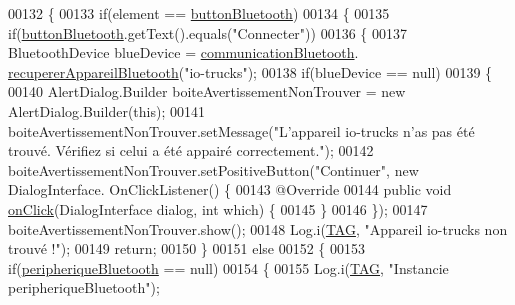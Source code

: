 \begin{DoxyCode}
00132     \{
00133         \textcolor{keywordflow}{if}(element == \hyperlink{classcom_1_1lasalle_1_1io__trucks_1_1_main_activity_a2197b0145db353437c41d1fc57f28650}{buttonBluetooth})
00134         \{
00135             \textcolor{keywordflow}{if}(\hyperlink{classcom_1_1lasalle_1_1io__trucks_1_1_main_activity_a2197b0145db353437c41d1fc57f28650}{buttonBluetooth}.getText().equals(\textcolor{stringliteral}{"Connecter"}))
00136             \{
00137                 BluetoothDevice blueDevice = \hyperlink{classcom_1_1lasalle_1_1io__trucks_1_1_main_activity_aef1818afc9c0d071330ccc244e4b3794}{communicationBluetooth}.
      \hyperlink{classcom_1_1lasalle_1_1io__trucks_1_1_communication_a84ae8043b94d6f156a30f6f90dbbba4e}{recupererAppareilBluetooth}(\textcolor{stringliteral}{"io-trucks"});
00138                 \textcolor{keywordflow}{if}(blueDevice == null)
00139                 \{
00140                     AlertDialog.Builder boiteAvertissementNonTrouver = \textcolor{keyword}{new} AlertDialog.Builder(\textcolor{keyword}{this});
00141                     boiteAvertissementNonTrouver.setMessage(\textcolor{stringliteral}{"L'appareil io-trucks n'as pas été trouvé.
       Vérifiez si celui a été appairé correctement."});
00142                     boiteAvertissementNonTrouver.setPositiveButton(\textcolor{stringliteral}{"Continuer"}, \textcolor{keyword}{new} DialogInterface.
      OnClickListener() \{
00143                         @Override
00144                         \textcolor{keyword}{public} \textcolor{keywordtype}{void} \hyperlink{classcom_1_1lasalle_1_1io__trucks_1_1_main_activity_a154e0d879d71bfbe95bc2d566517589d}{onClick}(DialogInterface dialog, \textcolor{keywordtype}{int} which) \{
00145                         \}
00146                     \});
00147                     boiteAvertissementNonTrouver.show();
00148                     Log.i(\hyperlink{classcom_1_1lasalle_1_1io__trucks_1_1_main_activity_a37b90dba972711328e3f4c83c55eb0fc}{TAG}, \textcolor{stringliteral}{"Appareil io-trucks non trouvé !"});
00149                     \textcolor{keywordflow}{return};
00150                 \}
00151                 \textcolor{keywordflow}{else}
00152                 \{
00153                     \textcolor{keywordflow}{if}(\hyperlink{classcom_1_1lasalle_1_1io__trucks_1_1_main_activity_a0c0b8e9294fa6c74c52886cb50687f18}{peripheriqueBluetooth} == null)
00154                     \{
00155                         Log.i(\hyperlink{classcom_1_1lasalle_1_1io__trucks_1_1_main_activity_a37b90dba972711328e3f4c83c55eb0fc}{TAG}, \textcolor{stringliteral}{"Instancie peripheriqueBluetooth"});

\end{DoxyCode}
